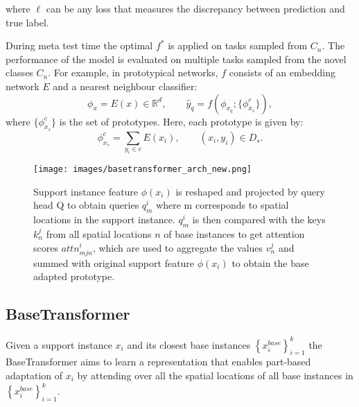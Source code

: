 \documentclass{bmvc2k}
\begin{document}
where $\ell$ can be any loss that measures the discrepancy between prediction and true label.

During meta test time the optimal \(f^{*}\) is applied on tasks sampled from \(C_{n}\). The performance of the model is evaluated on multiple tasks sampled from the novel classes \(C_{n}\).
For example, in prototypical networks, $f$ consists of an embedding network $E$ and a nearest neighbour classifier:
\begin{equation}
\phi_{x} = E(x) \in \mathbb{R}_{}^{d},
\qquad
\hat{y}_\mathit{q} = f(\phi_{x_\mathit{q}}; \{\phi_{x_\mathit{s}}^c\}),
\end{equation}
where \(\{\phi_{x_\mathit{s}}^c\}\) is the set of prototypes. Here, each prototype is given by: \begin{equation}\phi_{x_\mathit{s}}^c = \sum_{y_{i}\in c} E(x_{i}),\qquad \left (x_{i},y_{i}  \right )\in D_\mathit{s}.\end{equation}

\begin{figure}
\centering
\texttt{[image: images/basetransformer\_arch\_new.png]}
\caption{Support instance feature \(\phi(x_{i})\) is reshaped and projected by query head Q to obtain queries \(q_{m}^{i}\) where m corresponds to spatial locations in the support instance. \(q_{m}^{i}\) is then compared with the keys \(k_{n}^{j}\) from all spatial locations \(n\) of base instances to get attention scores \(attn_{mjn}^{i}\), which are used to aggregate the values \(v_{n}^{j}\) and summed with original support feature \(\phi(x_{i})\) to obtain the base adapted prototype.}
\label{fig:arch_image}
\end{figure}


\subsection{BaseTransformer} \label{sec:basetransformer}
Given a support instance \(x_{i}\) and its closest base instances \( \left \{  x_{i}^\mathit{base}   \right \}_{i=1}^{k}
\) the BaseTransformer aims to learn a representation that enables part-based adaptation of  \(x_{i}\) by attending over all the spatial locations of all base instances in \( \left \{  x_{i}^\mathit{base}   \right \}_{i=1}^{k}.\)
\end{document}
